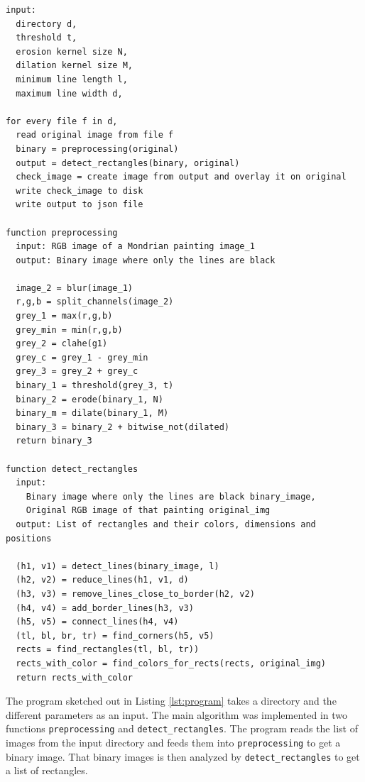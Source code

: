 \documentclass[serif,article,noparskip]{agse-thesis}
\begin{document}
\begin{lstlisting}[otherkeywords={function,input\:,output\:},label=lst:program,caption=Flow and structure of the program]
input:
  directory d,
  threshold t,
  erosion kernel size N,
  dilation kernel size M,
  minimum line length l,
  maximum line width d,

for every file f in d,
  read original image from file f
  binary = preprocessing(original)
  output = detect_rectangles(binary, original)
  check_image = create image from output and overlay it on original
  write check_image to disk
  write output to json file

function preprocessing
  input: RGB image of a Mondrian painting image_1
  output: Binary image where only the lines are black

  image_2 = blur(image_1)
  r,g,b = split_channels(image_2)
  grey_1 = max(r,g,b)
  grey_min = min(r,g,b)
  grey_2 = clahe(g1)
  grey_c = grey_1 - grey_min
  grey_3 = grey_2 + grey_c
  binary_1 = threshold(grey_3, t)
  binary_2 = erode(binary_1, N)
  binary_m = dilate(binary_1, M)
  binary_3 = binary_2 + bitwise_not(dilated)
  return binary_3

function detect_rectangles
  input:
    Binary image where only the lines are black binary_image,
    Original RGB image of that painting original_img
  output: List of rectangles and their colors, dimensions and positions

  (h1, v1) = detect_lines(binary_image, l)
  (h2, v2) = reduce_lines(h1, v1, d)
  (h3, v3) = remove_lines_close_to_border(h2, v2)
  (h4, v4) = add_border_lines(h3, v3)
  (h5, v5) = connect_lines(h4, v4)
  (tl, bl, br, tr) = find_corners(h5, v5)
  rects = find_rectangles(tl, bl, tr))
  rects_with_color = find_colors_for_rects(rects, original_img)
  return rects_with_color
\end{lstlisting}

The program sketched out in Listing \ref{lst:program} takes a directory and the
different parameters as an input. The main algorithm was implemented in two
functions \texttt{preprocessing} and \texttt{detect\_rectangles}. The program
reads the list of images from the input directory and feeds them into
\texttt{preprocessing} to get a binary image. That binary images is then
analyzed by \texttt{detect\_rectangles} to get a list of rectangles.
\end{document}
